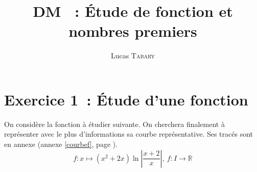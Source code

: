 \documentclass{article}
\title{\textbf{DM \No 9~: Étude de fonction et nombres premiers}}
\author{Lucas \textsc{Tabary}}
\date{}
\begin{document}
  \maketitle
  \hrulefill

  \vspace{1.2cm}
  \hrulefill

  \section*{Exercice 1~: Étude d'une fonction}
  On considère la fonction à étudier suivante. On cherchera finalement à représenter avec le plus d'informations sa courbe représentative. Ses tracés sont en annexe (annexe \ref{courbef}, page \pageref{courbef}).
  \begin{displaymath}
    f\colon x\mapsto (x^2 + 2x)\ln\left|\frac{x + 2}{x}\right|,\ f\colon I\to\mathbb{R}
  \end{displaymath}
\end{document}
